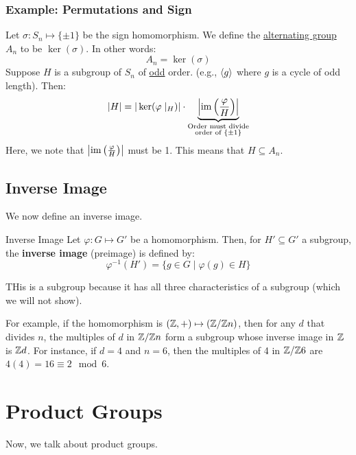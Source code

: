 \documentclass[letterpaper]{article}
\begin{document}
\subsubsection{Example: Permutations and Sign}
Let $\sigma: S_n \mapsto \{\pm 1\}$ be the sign homomorphism. We define the \underline{alternating group} $A_n$ to be $\ker(\sigma)$. In other words:
\[A_n = \ker(\sigma)\]
Suppose $H$ is a subgroup of $S_n$ of \underline{odd} order. (e.g., $\langle g \rangle$ where $g$ is a cycle of odd length). Then: 
\[|H| = |\ker(\varphi \mid_H)| \cdot \underbrace{\left|\operatorname{im}\left(\frac{\varphi}{H}\right)\right|}_{\substack{\text{Order must divide} \\ \text{order of } \{\pm 1\}}}\]
Here, we note that $\left|\operatorname{im}\left(\frac{\varphi}{H}\right)\right|$ must be 1. This means that $H \subseteq A_n$. 

\subsection{Inverse Image}
We now define an inverse image.
\begin{definition}{Inverse Image}{}
    Let $\varphi: G \mapsto G'$ be a homomorphism. Then, for $H' \subseteq G'$ a subgroup, the \textbf{inverse image} (preimage) is defined by: 
\[\varphi^{-1}(H') = \{g \in G \mid \varphi(g) \in H\}\]
\end{definition}
THis is a subgroup because it has all three characteristics of a subgroup (which we will not show). 

\bigskip

For example, if the homomorphism is $(\mathbb{Z}, +) \mapsto (\mathbb{Z} / \mathbb{Z} n)$, then for any $d$ that divides $n$, the multiples of $d$ in $\mathbb{Z} / \mathbb{Z} n$ form a subgroup whose inverse image in $\mathbb{Z}$ is $\mathbb{Z} d$. For instance, if $d = 4$ and $n = 6$, then the multiples of 4 in $\mathbb{Z} / \mathbb{Z} 6$ are $4(4) = 16 \equiv 2 \mod{6}$. 










\newpage 
\section{Product Groups}
Now, we talk about product groups. 
\end{document}

